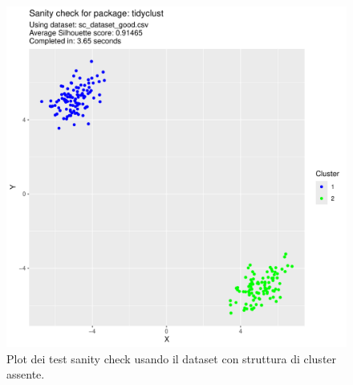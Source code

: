 \documentclass[italian]{article}
\begin{document}
\begin{figure}[h]
\begin{boxedminipage}{0.5\textwidth}
				\end{boxedminipage}
				\begin{boxedminipage}{0.5\textwidth}
					\includegraphics[width = \textwidth, page = 2]{results/results_TIDYCLUST.pdf}
				\end{boxedminipage}
				\begin{boxedminipage}{0.5\textwidth}
				\end{boxedminipage}
				\caption{Plot dei test sanity check usando il dataset con struttura di cluster
				assente.}
				\label{fig:bad}
			\end{figure}
\end{document}
